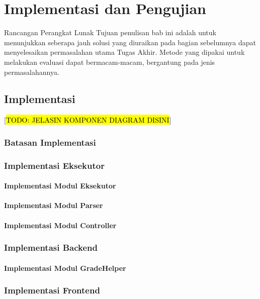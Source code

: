 \chapter{Implementasi dan Pengujian}
Rancangan Perangkat Lunak
Tujuan penulisan bab ini adalah untuk menunjukkan seberapa jauh solusi yang diuraikan pada bagian sebelumnya dapat menyelesaikan permasalahan utama Tugas Akhir. Metode yang dipakai untuk melakukan evaluasi dapat bermacam-macam, bergantung pada jenis permasalahannya.

\section{Implementasi}

 [\hl{TODO: JELASIN KOMPONEN DIAGRAM DISINI}]

\subsection{Batasan Implementasi}
\blindtext

\subsection{Implementasi Eksekutor}
\subsubsection{Implementasi Modul Eksekutor}
\blindtext
\subsubsection{Implementasi Modul Parser}
\blindtext
\subsubsection{Implementasi Modul Controller}
\blindtext

\subsection{Implementasi Backend}
\subsubsection{Implementasi Modul GradeHelper}
\blindtext


\subsection{Implementasi Frontend}

